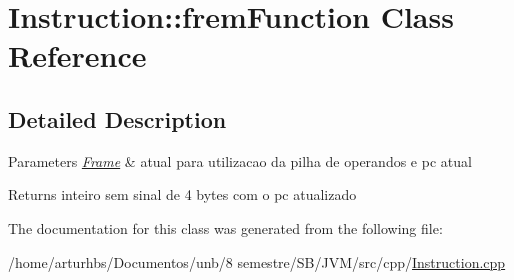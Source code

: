 \hypertarget{classInstruction_1_1fremFunction}{}\section{Instruction\+:\+:frem\+Function Class Reference}
\label{classInstruction_1_1fremFunction}


\subsection{Detailed Description}

\begin{DoxyParams}{Parameters}
{\em \hyperlink{classFrame}{Frame}} & atual para utilizacao da pilha de operandos e pc atual \\
\hline
\end{DoxyParams}
\begin{DoxyReturn}{Returns}
inteiro sem sinal de 4 bytes com o pc atualizado 
\end{DoxyReturn}


The documentation for this class was generated from the following file\+:\begin{DoxyCompactItemize}
\item 
/home/arturhbs/\+Documentos/unb/8 semestre/\+S\+B/\+J\+V\+M/src/cpp/\hyperlink{Instruction_8cpp}{Instruction.\+cpp}\end{DoxyCompactItemize}
